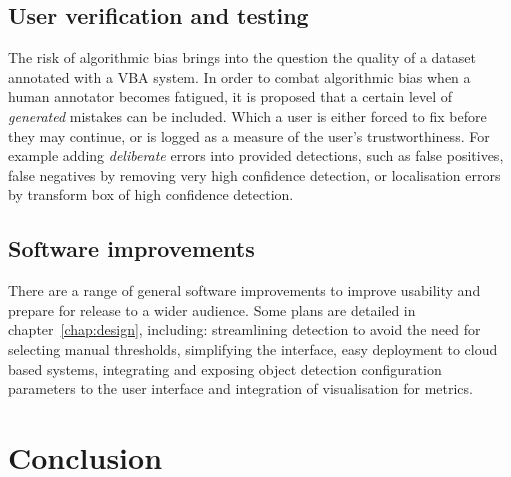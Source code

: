 \subsection{User verification and testing}
\label{sec:user_verification}

The risk of algorithmic bias brings into the question the quality of a dataset annotated with a \gls{VBA} system.  In order to combat algorithmic bias when a human annotator becomes fatigued, it is proposed that a certain level of \emph{generated} mistakes can be included. Which a user is either forced to fix before they may continue, or is logged as a measure of the user's trustworthiness. For example adding \emph{deliberate} errors into provided detections, such as false positives, false negatives by removing very high confidence detection, or localisation errors by transform box of high confidence detection. 


\subsection{Software improvements}

There are a range of general software improvements to improve usability and prepare for release to a wider audience. Some plans are detailed in chapter~\ref{chap:design}, including: streamlining detection to avoid the need for selecting manual thresholds, simplifying the interface, easy deployment to cloud based systems, integrating and exposing object detection configuration parameters to the user interface and integration of visualisation for metrics.

\section{Conclusion}